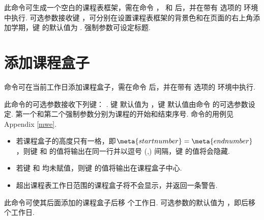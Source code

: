 \documentclass[letterpaper]{l3doc}
\begin{document}
\begin{function}{\maketable}
  \begin{syntax}
  \end{syntax}

  此命令可生成一个空白的课程表框架，需在命令 ， 和  后，并在带有  选项的  环境中执行. 可选参数接收键  ，可分别在设置课程表框架的背景色和在页面的右上角添加学期，键  的默认值为 . 强制参数可设定标题.
\end{function}

\section{添加课程盒子}

\begin{function}{\course}
  \begin{syntax}
  \end{syntax}

   命令可在当前工作日添加课程盒子，需在命令  后，并在带有  选项的  环境中执行.
  
  此命令的可选参数接收下列键：    . 键  默认值为 ，键  默认值由命令  的可选参数设定. 第一个和第二个强制参数分别为课程的开始和结束序号. 命令的用例见Appendix \ref{mwe}.
  
  \begin{itemize}
    \item 若课程盒子的高度只有一格，即$\meta{start number} = \meta{end number}$，则键  和  的值将输出在同一行并以逗号 (,) 间隔，键  的值将会隐藏.
    \item 若键  和  均未赋值，则键  的值将输出在课程盒子中心.
    \item 超出课程表工作日范围的课程盒子将不会显示，并返回一条警告.
  \end{itemize}
\end{function}

\begin{function}{\newday}
  \begin{syntax}
  \end{syntax}

  此命令可使其后面添加的课程盒子后移  个工作日. 可选参数的默认值为 ，即后移  个工作日.
\end{function}
\end{document}
